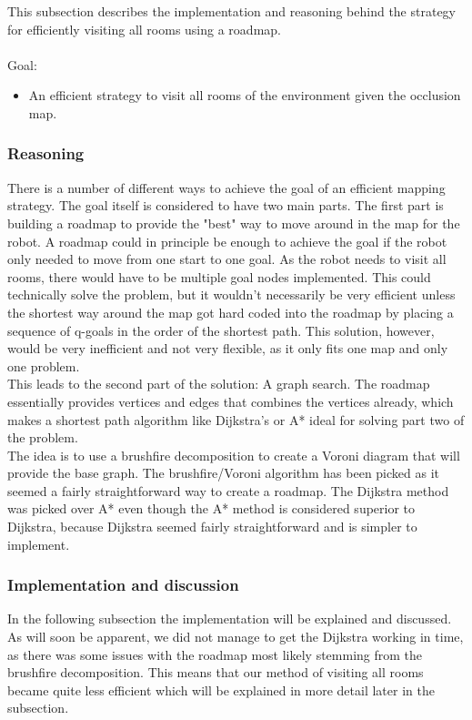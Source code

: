 \documentclass[../../../Main.tex]{subfiles}
\begin{document}
This subsection describes the implementation and reasoning behind the strategy for efficiently visiting all rooms using a roadmap.\\
\\
Goal:
\begin{itemize}
    \item An efficient strategy to visit all rooms of the environment given the occlusion map.
\end{itemize}
\subsubsection{Reasoning}
There is a number of different ways to achieve the goal of an efficient mapping strategy.
The goal itself is considered to have two main parts.
The first part is building a roadmap to provide the "best" way to move around in the map for the robot.
A roadmap could in principle be enough to achieve the goal if the robot only needed to move from one start to one goal.
As the robot needs to visit all rooms, there would have to be multiple goal nodes implemented.
This could technically solve the problem, but it wouldn't necessarily be very efficient unless the
shortest way around the map got hard coded into the roadmap by placing a sequence of q-goals in the order of the shortest path.
This solution, however, would be very inefficient and not very flexible, as it only fits one map and only one problem. \\
This leads to the second part of the solution: A graph search.
The roadmap essentially provides vertices and edges that combines the vertices already,
which makes a shortest path algorithm like Dijkstra's or A* ideal for solving part two of the problem. \\
The idea is to use a brushfire decomposition to create a Voroni diagram that will provide the base graph.
The brushfire/Voroni algorithm has been picked as it seemed a fairly straightforward way to create a roadmap.
The Dijkstra method was picked over A* even though the A* method is considered superior to Dijkstra, because Dijkstra seemed fairly straightforward and is simpler to implement.
\subsubsection{Implementation and discussion}
In the following subsection the implementation will be explained and discussed. \\
As will soon be apparent, we did not manage to get the Dijkstra working in time, as there was some issues with the roadmap most likely stemming from the brushfire decomposition.
This means that our method of visiting all rooms became quite less efficient which will be
explained in more detail later in the subsection.
\end{document}
